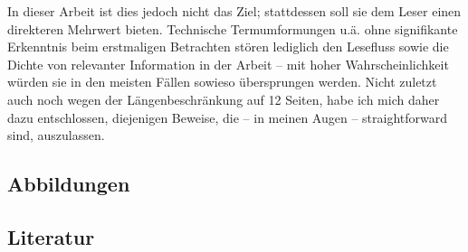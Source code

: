 \documentclass[a4paper,12pt,ngerman]{scrartcl}
\theoremstyle{plain}
\theoremstyle{plain}
\begin{document}
In dieser Arbeit ist dies jedoch nicht das Ziel; stattdessen soll sie dem Leser einen direkteren Mehrwert bieten. Technische Termumformungen u.ä. ohne signifikante Erkenntnis beim erstmaligen Betrachten stören lediglich den Lesefluss sowie die Dichte von relevanter Information in der Arbeit -- mit hoher Wahrscheinlichkeit würden sie in den meisten Fällen sowieso übersprungen werden. Nicht zuletzt auch noch wegen der Längenbeschränkung auf 12 Seiten, habe ich mich daher dazu entschlossen, diejenigen Beweise, die -- in meinen Augen -- straightforward sind, auszulassen.

\subsection{Abbildungen}

\subsection{Literatur}
\end{document}
